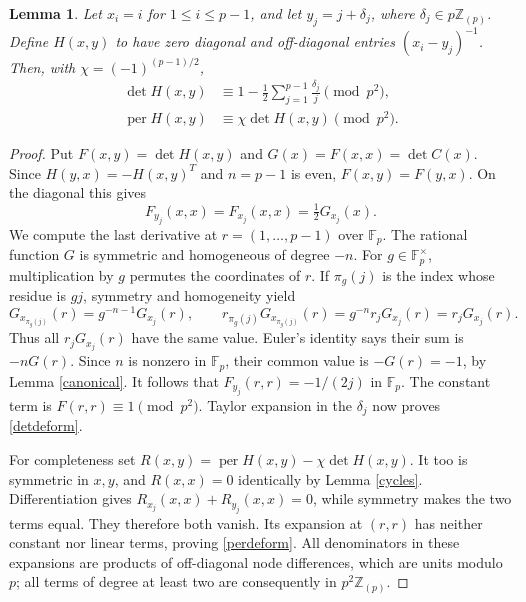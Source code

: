 \documentclass[11pt]{article}
\newtheorem{lemma}[theorem]{Lemma}
\DeclareMathOperator{\per}{per}
\newcommand{\Fp}{\mathbb F_p}
\newcommand{\Zp}{\mathbb Z_{(p)}}
\begin{document}
\begin{lemma}\label{deformation}
Let $x_i=i$ for $1\leq i\leq p-1$, and let $y_j=j+\delta_j$,
where $\delta_j\in p\Zp$. Define $H(x,y)$ to have zero diagonal and
off-diagonal entries $(x_i-y_j)^{-1}$. Then, with
$\chi=(-1)^{(p-1)/2}$,
\begin{align}
 \det H(x,y)&\equiv1-\frac12\sum_{j=1}^{p-1}\frac{\delta_j}{j}
                    \pmod{p^2},\label{detdeform}\\
 \per H(x,y)&\equiv\chi\det H(x,y)\pmod{p^2}.\label{perdeform}
\end{align}
\end{lemma}
\begin{proof}
Put $F(x,y)=\det H(x,y)$ and $G(x)=F(x,x)=\det C(x)$.
Since $H(y,x)=-H(x,y)^T$ and $n=p-1$ is even,
$F(x,y)=F(y,x)$. On the diagonal this gives
\[
 F_{y_j}(x,x)=F_{x_j}(x,x)=\tfrac12G_{x_j}(x).
\]
We compute the last derivative at $r=(1,\ldots,p-1)$ over $\Fp$.
The rational function $G$ is symmetric and homogeneous of degree $-n$.
For $g\in\Fp^\times$, multiplication by $g$ permutes the coordinates
of $r$. If $\pi_g(j)$ is the index whose residue is $gj$, symmetry and
homogeneity yield
\[
 G_{x_{\pi_g(j)}}(r)=g^{-n-1}G_{x_j}(r),\qquad
 r_{\pi_g(j)}G_{x_{\pi_g(j)}}(r)
     =g^{-n}r_jG_{x_j}(r)=r_jG_{x_j}(r).
\]
Thus all $r_jG_{x_j}(r)$ have the same value. Euler's identity says their
sum is $-nG(r)$. Since $n$ is nonzero in $\Fp$, their common value is
$-G(r)=-1$, by Lemma \ref{canonical}. It follows that
$F_{y_j}(r,r)=-1/(2j)$ in $\Fp$.
The constant term is $F(r,r)\equiv1\pmod{p^2}$. Taylor expansion in
the $\delta_j$ now proves \eqref{detdeform}.

For completeness set $R(x,y)=\per H(x,y)-\chi\det H(x,y)$.
It too is symmetric in $x,y$, and $R(x,x)=0$ identically by
Lemma \ref{cycles}. Differentiation gives
$R_{x_j}(x,x)+R_{y_j}(x,x)=0$, while symmetry makes the two terms equal.
They therefore both vanish. Its expansion at $(r,r)$ has neither
constant nor linear terms, proving \eqref{perdeform}.
All denominators in these expansions are products of off-diagonal
node differences, which are units modulo $p$; all terms of degree at
least two are consequently in $p^2\Zp$.
\end{proof}
\end{document}
